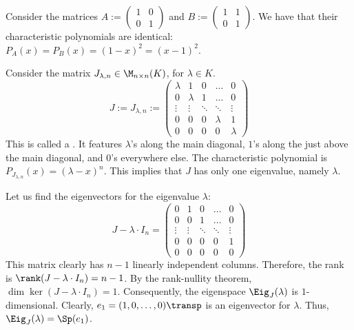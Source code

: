\begin{example}\label{ex:char_poly_same}
  Consider the matrices $A := \left(\begin{smallmatrix} 1 & 0 \\ 0 & 1 \end{smallmatrix}\right)$ and $B := \left(\begin{smallmatrix} 1 & 1 \\ 0 & 1 \end{smallmatrix}\right)$.
  We have that their characteristic polynomials are identical: $P_A(x) = P_B(x) = (1-x)^2 = (x-1)^2$.
\end{example}

\begin{example}\label{ex:jordan_block_mult}
  Consider the matrix $J_{\lambda, n} \in \M_{n \times n}(K)$, for $\lambda \in K$.
  \begin{equation} \label{eq:jordan_block}
    J := J_{\lambda,n} := \begin{pmatrix} \lambda & 1 & 0 & \dots & 0 \\ 0 & \lambda & 1 & \dots & 0 \\ \vdots & \vdots & \ddots & \ddots & \vdots \\ 0 & 0 & 0 & \lambda & 1 \\ 0 & 0 & 0 & 0 & \lambda \end{pmatrix}
  \end{equation}
  This is called a . It features $\lambda$'s along the main diagonal, $1$'s along the  just above the main diagonal, and $0$'s everywhere else.
  The characteristic polynomial is $P_{J_{\lambda, n}}(x) = (\lambda - x)^n$. This implies that $J$ has only one eigenvalue, namely $\lambda$.

  Let us find the eigenvectors for the eigenvalue $\lambda$:
  \[ J - \lambda \cdot I_n = \begin{pmatrix} 0 & 1 & 0 & \dots & 0 \\ 0 & 0 & 1 & \dots & 0 \\ \vdots & \vdots & \ddots & \ddots & \vdots \\ 0 & 0 & 0 & 0 & 1 \\ 0 & 0 & 0 & 0 & 0 \end{pmatrix} \]
  This matrix clearly has $n-1$ linearly independent columns.
  Therefore, the rank is $\rank(J - \lambda \cdot I_n) = n - 1$.
  By the rank-nullity theorem, $\dim \ker(J - \lambda \cdot I_n) = 1$.
  Consequently, the eigenspace $\Eig_J(\lambda)$ is $1$-dimensional.
  Clearly, $e_1 = (1, 0, \dots, 0)\transp$ is an eigenvector for $\lambda$.
  Thus, $\Eig_J(\lambda) = \Sp(e_1)$.
\end{example}

